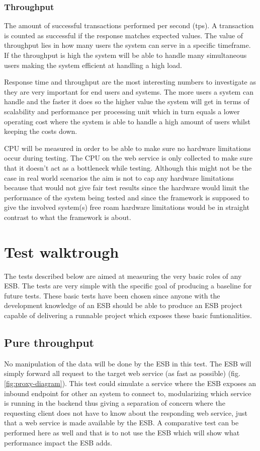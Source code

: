 \subsubsection{Throughput}
The amount of successful transactions performed per second (tps). A transaction is counted as successful if the response matches expected values.
The value of throughput lies in how many users the system can serve in a specific timeframe. If the throughput is high the system will be able to handle many simultaneous users making the system efficient at handling a high load.



Response time and throughput are the most interesting numbers to investigate as they are very important for end users and systems. 
The more users a system can handle and the faster it does so the higher value the system will get in terms of scalability and performance per processing unit which in turn equals a lower operating cost where the system is able to handle a high amount of users whilst keeping the costs down.

CPU will be measured in order to be able to make sure no hardware limitations occur during testing. 
The CPU on the web service is only collected to make sure that it doesn't act as a bottleneck while testing. 
Although this might not be the case in real world scenarios the aim is not to cap any hardware limitations because that would not give fair test results since the hardware would limit the performance of the system being tested and since the framework is supposed to give the involved system(s) free roam hardware limitations would be in straight contrast to what the framework is about.

\section{Test walktrough}
The tests described below are aimed at measuring the very basic roles of any ESB. 
The tests are very simple with the specific goal of producing a baseline for future tests. 
These basic tests have been chosen since anyone with the development knowledge of an ESB should be able to produce an ESB project capable of delivering a runnable project which exposes these basic funtionalities.

\subsection{Pure throughput}
No manipulation of the data will be done by the ESB in this test. The ESB will simply forward all request to the target web service (as fast as possible) (fig.\ref{fig:proxy-diagram}). 
This test could simulate a service where the ESB exposes an inbound endpoint for other an system to connect to, modularizing which service is running in the backend thus giving a separation of concern where the requesting client does not have to know about the responding web service, just that a web service is made available by the ESB.
A comparative test can be performed here as well and that is to not use the ESB which will show what performance impact the ESB adds. 

